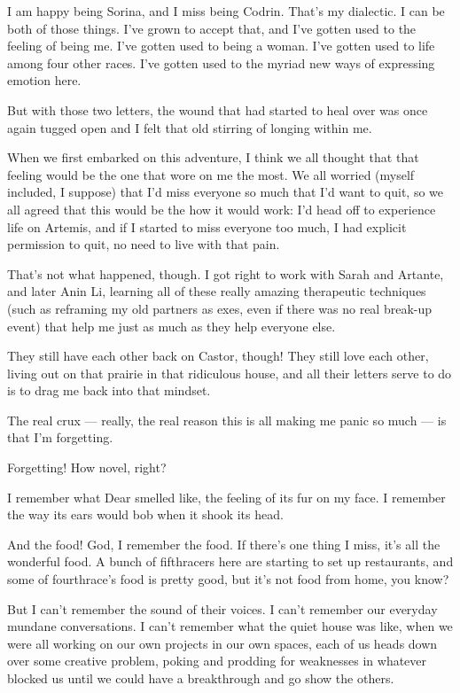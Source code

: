I am happy being Sorina, and I miss being Codrin. That's my dialectic. I can be both of those things. I've grown to accept that, and I've gotten used to the feeling of being me. I've gotten used to being a woman. I've gotten used to life among four other races. I've gotten used to the myriad new ways of expressing emotion here.

But with those two letters, the wound that had started to heal over was once again tugged open and I felt that old stirring of longing within me.

When we first embarked on this adventure, I think we all thought that that feeling would be the one that wore on me the most. We all worried (myself included, I suppose) that I'd miss everyone so much that I'd want to quit, so we all agreed that this would be the how it would work: I'd head off to experience life on Artemis, and if I started to miss everyone too much, I had explicit permission to quit, no need to live with that pain.

That's not what happened, though. I got right to work with Sarah and Artante, and later Anin Li, learning all of these really amazing therapeutic techniques (such as reframing my old partners as exes, even if there was no real break-up event) that help me just as much as they help everyone else.

They still have each other back on Castor, though! They still love each other, living out on that prairie in that ridiculous house, and all their letters serve to do is to drag me back into that mindset.

The real crux — really, the real reason this is all making me panic so much — is that I'm forgetting.

Forgetting! How novel, right?

I remember what Dear smelled like, the feeling of its fur on my face. I remember the way its ears would bob when it shook its head.

And the food! God, I remember the food. If there's one thing I miss, it's all the wonderful food. A bunch of fifthracers here are starting to set up restaurants, and some of fourthrace's food is pretty good, but it's not food from home, you know?

But I can't remember the sound of their voices. I can't remember our everyday mundane conversations. I can't remember what the quiet house was like, when we were all working on our own projects in our own spaces, each of us heads down over some creative problem, poking and prodding for weaknesses in whatever blocked us until we could have a breakthrough and go show the others.

